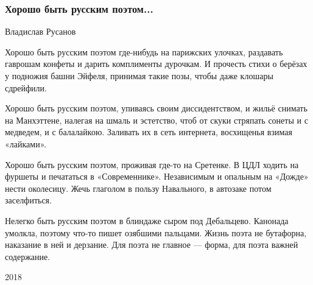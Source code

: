  
 
 

\subsubsection{Хорошо быть русским поэтом...}

Владислав Русанов

Хорошо быть русским поэтом
где-нибудь на парижских улочках,
раздавать гаврошам конфеты
и дарить комплименты дурочкам.
И прочесть стихи о берёзах
у подножия башни Эйфеля,
принимая такие позы,
чтобы даже клошары сдрейфили.

Хорошо быть русским поэтом,
упиваясь своим диссидентством,
и жильё снимать на Манхэттене,
налегая на шмаль и эстетство,
чтоб от скуки стряпать сонеты
и с медведем, и с балалайкою.
Заливать их в сеть интернета,
восхищенья взимая «лайками».

Хорошо быть русским поэтом,
проживая где-то на Сретенке.
В ЦДЛ ходить на фуршеты
и печататься в «Современнике».
Независимым и опальным
на «Дожде» нести околесицу.
Жечь глаголом в пользу Навального,
в автозаке потом заселфиться.

Нелегко быть русским поэтом
в блиндаже сыром под Дебальцево.
Канонада умолкла, поэтому
что-то пишет озябшими пальцами.
Жизнь поэта не бутафорна,
наказание в ней и дерзание.
Для поэта не главное — форма,
для поэта важней содержание.

2018

